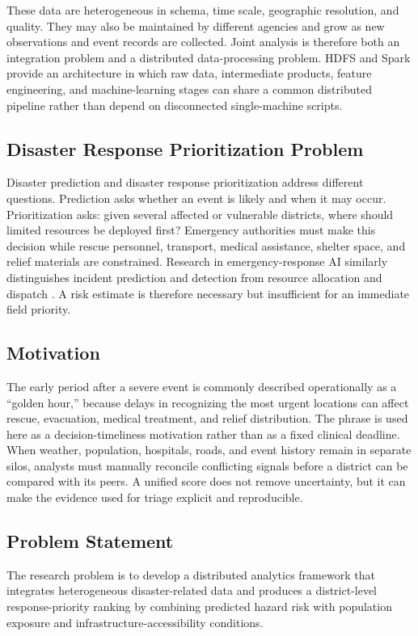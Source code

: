 \documentclass[conference]{IEEEtran}
\begin{document}
These data are heterogeneous in schema, time scale, geographic resolution, and
quality. They may also be maintained by different agencies and grow as new
observations and event records are collected. Joint analysis is therefore both
an integration problem and a distributed data-processing problem. HDFS and
Spark provide an architecture in which raw data, intermediate products, feature
engineering, and machine-learning stages can share a common distributed
pipeline rather than depend on disconnected single-machine scripts.

\subsection{Disaster Response Prioritization Problem}
Disaster prediction and disaster response prioritization address different
questions. Prediction asks whether an event is likely and when it may occur.
Prioritization asks: given several affected or vulnerable districts, where
should limited resources be deployed first? Emergency authorities must make
this decision while rescue personnel, transport, medical assistance, shelter
space, and relief materials are constrained. Research in emergency-response AI
similarly distinguishes incident prediction and detection from resource
allocation and dispatch \cite{mukhopadhyay}. A risk estimate is therefore
necessary but insufficient for an immediate field priority.

\subsection{Motivation}
The early period after a severe event is commonly described operationally as a
``golden hour,'' because delays in recognizing the most urgent locations can
affect rescue, evacuation, medical treatment, and relief distribution. The
phrase is used here as a decision-timeliness motivation rather than as a fixed
clinical deadline. When weather, population, hospitals, roads, and event
history remain in separate silos, analysts must manually reconcile conflicting
signals before a district can be compared with its peers. A unified score does
not remove uncertainty, but it can make the evidence used for triage explicit
and reproducible.

\subsection{Problem Statement}
The research problem is to develop a distributed analytics framework that
integrates heterogeneous disaster-related data and produces a district-level
response-priority ranking by combining predicted hazard risk with population
exposure and infrastructure-accessibility conditions.
\end{document}
